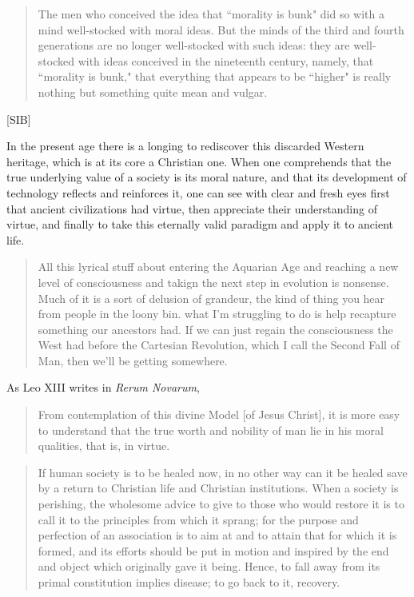 \documentclass[letterpaper]{article}
\begin{document}
\begin{quote}
  The men who conceived the idea that ``morality is bunk" did so with a mind well-stocked with moral ideas. But the minds of the third and fourth generations are no longer well-stocked with such ideas: they are well-stocked with ideas conceived in the nineteenth century, namely, that ``morality is bunk," that everything that appears to be ``higher" is really nothing but something quite mean and vulgar.
\end{quote}[SIB]

In the present age there is a longing to rediscover this discarded Western heritage, which is at its core a Christian one. When one comprehends that the true underlying value of a society is its moral nature, and that its development of technology reflects and reinforces it, one can see with clear and fresh eyes first that ancient civilizations had virtue, then appreciate their understanding of virtue, and finally to take this eternally valid paradigm and apply it to ancient life.

\begin{quote}
  All this lyrical stuff about entering the Aquarian Age and reaching a new level of consciousness and takign the next step in evolution is nonsense. Much of it is a sort of delusion of grandeur, the kind of thing you hear from people in the loony bin. what I'm struggling to do is help recapture something our ancestors had. If we can just regain the consciousness the West had before the Cartesian Revolution, which I call the Second Fall of Man, then we'll be getting somewhere.

\end{quote}

As Leo XIII writes in \textit{Rerum Novarum},

\begin{quote}
  From contemplation of this divine Model [of Jesus Christ], it is more easy to understand that the true worth and nobility of man lie in his moral qualities, that is, in virtue.
\end{quote}

\begin{quote}
  If human society is to be healed now, in no other way can it be healed save by a return to Christian life and Christian institutions. When a society is perishing, the wholesome advice to give to those who would restore it is to call it to the principles from which it sprang; for the purpose and perfection of an association is to aim at and to attain that for which it is formed, and its efforts should be put in motion and inspired by the end and object which originally gave it being. Hence, to fall away from its primal constitution implies disease; to go back to it, recovery.
\end{quote}
\end{document}
